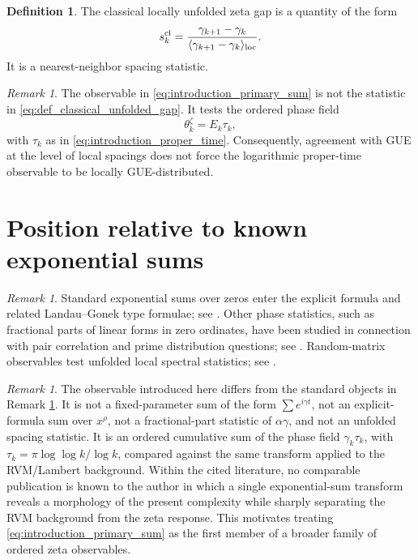 \documentclass[11pt]{amsart}
\numberwithin{equation}{section}
\theoremstyle{plain}
\theoremstyle{definition}
\newtheorem{definition}[theorem]{Definition}
\theoremstyle{remark}
\newtheorem{remark}[theorem]{Remark}
\begin{document}
\begin{definition}
\label{def:classical_unfolded_gap}
The classical locally unfolded zeta gap is a quantity of the form
\begin{equation}
s_k^{\rm cl}
=
\frac{\gamma_{k+1}-\gamma_k}{\langle \gamma_{k+1}-\gamma_k\rangle_{\rm loc}}.
\label{eq:def_classical_unfolded_gap}
\end{equation}
It is a nearest-neighbor spacing statistic.
\end{definition}

\begin{remark}
\label{rem:not_classical_gap}
The observable in \eqref{eq:introduction_primary_sum} is not the statistic in \eqref{eq:def_classical_unfolded_gap}.  It tests the ordered phase field
\begin{equation}
\theta_k^\zeta
=
E_k\tau_k,
\label{eq:not_classical_gap_phase_field}
\end{equation}
with \(\tau_k\) as in \eqref{eq:introduction_proper_time}.  Consequently, agreement with GUE at the level of local spacings does not force the logarithmic proper-time observable to be locally GUE-distributed.
\end{remark}


\section{Position relative to known exponential sums}
\label{sec:position_known_exponential_sums}

\begin{remark}
\label{rem:standard_exponential_sum_context}
Standard exponential sums over zeros enter the explicit formula and related Landau--Gonek type formulae; see \cite{Titchmarsh1986,IwaniecKowalski2004}.  Other phase statistics, such as fractional parts of linear forms in zero ordinates, have been studied in connection with pair correlation and prime distribution questions; see \cite{FordZaharescu2009}.  Random-matrix observables test unfolded local spectral statistics; see \cite{Montgomery1973,Odlyzko1987,Mehta2004}.
\end{remark}

\begin{remark}
\label{rem:novel_observable_claim}
The observable introduced here differs from the standard objects in Remark \ref{rem:standard_exponential_sum_context}.  It is not a fixed-parameter sum of the form \(\sum e^{i\gamma t}\), not an explicit-formula sum over \(x^\rho\), not a fractional-part statistic of \(\alpha\gamma\), and not an unfolded spacing statistic.  It is an ordered cumulative sum of the phase field \(\gamma_k\tau_k\), with \(\tau_k=\pi\log\log k/\log k\), compared against the same transform applied to the RVM/Lambert background.  Within the cited literature, no comparable publication is known to the author in which a single exponential-sum transform reveals a morphology of the present complexity while sharply separating the RVM background from the zeta response.  This motivates treating \eqref{eq:introduction_primary_sum} as the first member of a broader family of ordered zeta observables.
\end{remark}
\end{document}
